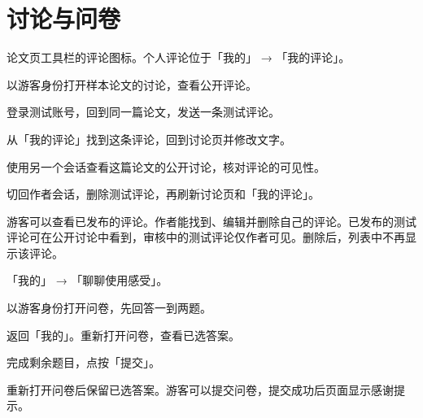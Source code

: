\documentclass[UTF8,a4paper,zihao=-4,fontset=fandol]{ctexart}
\newcommand{\ui}[1]{「#1」}
\begin{document}
\clearpage
{}
\section{讨论与问卷}

  {论文页工具栏的评论图标。个人评论位于\ui{我的} → \ui{我的评论}。}
  {\item 以游客身份打开样本论文的讨论，查看公开评论。
   \item 登录测试账号，回到同一篇论文，发送一条测试评论。
   \item 从\ui{我的评论}找到这条评论，回到讨论页并修改文字。
   \item 使用另一个会话查看这篇论文的公开讨论，核对评论的可见性。
   \item 切回作者会话，删除测试评论，再刷新讨论页和\ui{我的评论}。}
  {游客可以查看已发布的评论。作者能找到、编辑并删除自己的评论。已发布的测试评论可在公开讨论中看到，审核中的测试评论仅作者可见。删除后，列表中不再显示该评论。}

  {\ui{我的} → \ui{聊聊使用感受}。}
  {\item 以游客身份打开问卷，先回答一到两题。
   \item 返回\ui{我的}。重新打开问卷，查看已选答案。
   \item 完成剩余题目，点按\ui{提交}。}
  {重新打开问卷后保留已选答案。游客可以提交问卷，提交成功后页面显示感谢提示。}
\end{document}
